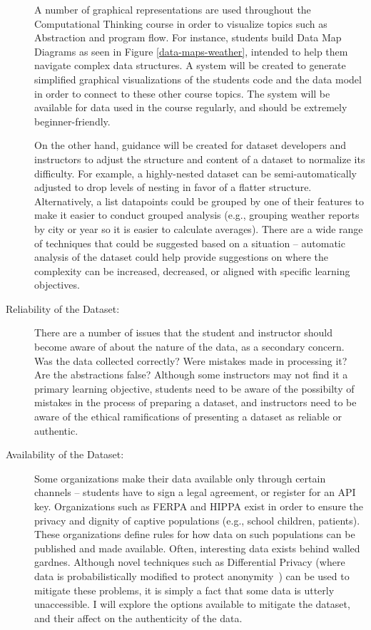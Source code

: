 \begin{description}
		A number of graphical representations are used throughout the Computational Thinking course in order to visualize topics such as Abstraction and program flow.
		For instance, students build Data Map Diagrams as seen in Figure \ref{data-maps-weather}, intended to help them navigate complex data structures.
		A system will be created to generate simplified graphical visualizations of the students code and the data model in order to connect to these other course topics.
		The system will be available for data used in the course regularly, and should be extremely beginner-friendly.
		
		On the other hand, guidance will be created for dataset developers and instructors to adjust the structure and content of a dataset to normalize its difficulty.
		For example, a highly-nested dataset can be semi-automatically adjusted to drop levels of nesting in favor of a flatter structure.
		Alternatively, a list datapoints could be grouped by one of their features to make it easier to conduct grouped analysis (e.g., grouping weather reports by city or year so it is easier to calculate averages).
		There are a wide range of techniques that could be suggested based on a situation -- automatic analysis of the dataset could help provide suggestions on where the complexity can be increased, decreased, or aligned with specific learning objectives. 
	\item[Reliability of the Dataset:] There are a number of issues that the student and instructor should become aware of about the nature of the data, as a secondary concern. Was the data collected correctly? Were mistakes made in processing it? Are the abstractions false? Although some instructors may not find it a primary learning objective, students need to be aware of the possibilty of mistakes in the process of preparing a dataset, and instructors need to be aware of the ethical ramifications of presenting a dataset as reliable or authentic.
	\item[Availability of the Dataset:] Some organizations make their data available only through certain channels -- students have to sign a legal agreement, or register for an API key. Organizations such as FERPA and HIPPA exist in order to ensure the privacy and dignity of captive populations (e.g., school children, patients). These organizations define rules for how data on such populations can be published and made available. Often, interesting data exists behind walled gardnes. Although novel techniques such as Differential Privacy (where data is probabilistically modified to protect anonymity~\cite{dwork2011differential}) can be used to mitigate these problems, it is simply a fact that some data is utterly unaccessible. I will explore the options available to mitigate the dataset, and their affect on the authenticity of the data.
	

\end{description}
